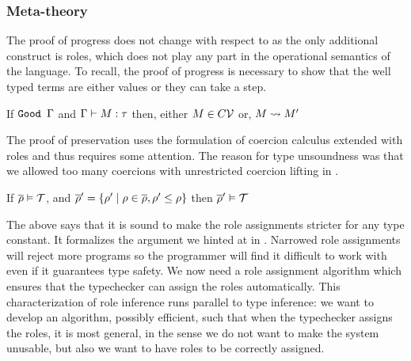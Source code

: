 \documentclass[screen,nonacm]{acmart}
\begin{document}
\subsubsection{Meta-theory}\label{sec:sfr-metatheory}
The proof of progress does not change with respect to \SFC as the only additional construct is roles, which does not play any part in the operational semantics of the language. To recall, the proof of progress is necessary to show that the well typed terms are either values or they can take a step.

\begin{theorem}\label{lem:sfr-progress}
 If $\texttt{Good~}\Gamma$ and $\Gamma \vdash M : \tau$ then, either $M \in C\mathcal{V}$ or, $M \rightsquigarrow M'$
\end{theorem}

The proof of preservation uses the formulation of coercion calculus extended with roles and thus requires some attention. The reason for type unsoundness was that we allowed too many coercions with unrestricted coercion lifting in \SFC.

\begin{lemma}\label{lem:role-narrowing}
If $\overline{\rho} \mathrel{\vDash} \mathcal{T}$, and $\overline{\rho}' = \{\rho' \mid \rho \in \overline{\rho}, \rho' \leq \rho\}$ then $\overline{\rho}' \mathrel{\vDash} \mathcal{T}$
\end{lemma}

The above  says that it is sound to make the role assignments stricter for any type constant. It formalizes the argument we hinted at in . Narrowed role assignments will reject more programs so the programmer will find it difficult to work with even if it guarantees type safety.
We now need a role assignment algorithm which ensures that the typechecker can assign the roles automatically. This characterization of role inference runs parallel to type inference: we want to develop an algorithm, possibly efficient, such that when the typechecker assigns the roles, it is most general, in the sense we do not want to make the system unusable, but also we want to have roles to be correctly assigned.
\end{document}
